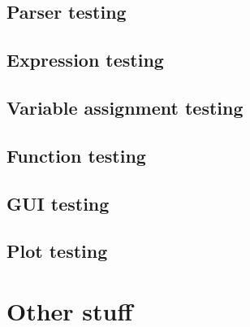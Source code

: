 \documentclass[a4paper, oneside, 11pt]{report}
\begin{document}
\section{Parser testing}\label{sec:parser-testing}

\section{Expression testing}\label{sec:arithmetic-expression-testing}

\section{Variable assignment testing}\label{sec:variable-assignment-testing}

\section{Function testing}\label{sec:function-testing}

\section{GUI testing}\label{sec:gui-testing}

\section{Plot testing}\label{sec:plot-testing}

\chapter{Other stuff}\label{ch:other-stuff}
	
	
\end{document}
